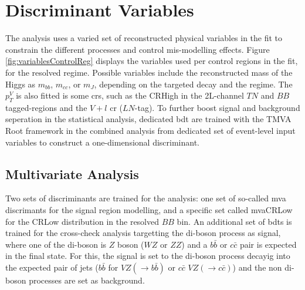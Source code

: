 \section{Discriminant Variables}\label{sec-vh-disc}
The analysis uses a varied set of reconstructed physical variables in the fit to constrain the different processes and control mis-modelling effects. Figure \ref{fig:variablesControlReg} displays the variables used per control regions in the fit, for the resolved regime. Possible variables include the reconstructed mass of the Higgs as $m_{bb}$, $m_{cc}$, or $m_J$, depending on the targeted decay and the regime. The $p_T^V$ is also fitted is some \gls{cr}s, such as the CRHigh in the 2L-channel $TN$ and $BB$ tagged-regions and the $V+l$ \gls{cr} ($LN$-tag). To further boost signal and background seperation in the statistical analysis, dedicated \gls{bdt} are trained with the \textsc{TMVA} Root framework \cite{Therhaag:2011jh} in the combined analysis from dedicated set of event-level input variables to construct a one-dimensional discriminant. \\

\subsection{Multivariate Analysis}
Two sets of discriminants are trained for the analysis: one set of so-called \gls{mva} discrimants for the signal region modelling, and a specific set called mvaCRLow for the CRLow distribution in the resolved $BB$ bin. An additional set of \gls{bdt}s is trained for the cross-check analysis targetting the di-boson process as signal, where one of the di-boson is $Z$ boson ($WZ$ or $ZZ$) and a $b\bar{b}$ or $c\bar{c}$ pair is expected in the final state. For this, the signal is set to the di-boson process decayig into the expected pair of jets ($b\bar{b}$ for $VZ(\rightarrow b\bar{b})$ or $c\bar{c}$ $VZ(\rightarrow c\bar{c})$) and the non di-boson processes are set as background.

